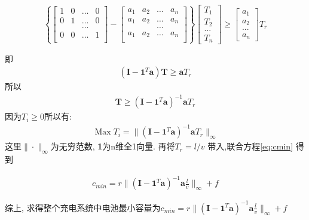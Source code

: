     \begin{equation}     
        \left\{
            \left[                 
                \begin{array}{cccc}   
                1 & 0 & \dots& 0 \\  
                0 & 1  & \dots& 0 \\ 
                &&\dots&\\
                0&0&\dots&1\\
                \end{array}
            \right] 
            -
            \left[                 
            \begin{array}{cccc}   
                a_1 & a_2 & \dots& a_n \\ 
                a_1 & a_2  & \dots& a_n \\  
                &&\dots&\\
                a_1&a_2&\dots&a_n\\
            \end{array}
            \right]    
        \right\}   
        \left[
            \begin{array}{cccc}
             T_1\\
             T_2\\
             ... \\
             T_{n}
            \end{array}
        \right ]
        \geq
        \left[
            \begin{array}{cccc}
            a_{1}\\
            a_{2}\\
            ... \\
            a_{n}
            \end{array}
        \right ]
        T_r 
        \end{equation}

即
\begin{eqnarray}
  (\textbf{I}- \textbf{1}^T\textbf{a} )\textbf{T} \geq \textbf{a} T_r
\end{eqnarray}
所以
\begin{eqnarray}
  \textbf{T} \geq   (\textbf{I}- \textbf{1}^T\textbf{a} )^{-1}\textbf{a} T_r
\end{eqnarray}
因为$T_i \geq 0$所以有:
\begin{eqnarray}
    \mathop{Max}T_i = \| (\textbf{I}- \textbf{1}^T\textbf{a} )^{-1}\textbf{a} T_r\|_{\infty}
\end{eqnarray}
这里$\|\cdot\|_\infty$为无穷范数, \textbf{1}为n维全1向量. 再将$ T_r = l/v$ 带入,联合方程\ref{eq:cmin} 得到

\begin{eqnarray}
    c_{min} =r \| (\textbf{I}- \textbf{1}^T\textbf{a} )^{-1}\textbf{a} \frac{l}{v}\|_{\infty} +f
\end{eqnarray}

综上, 求得整个充电系统中电池最小容量为$ c_{min} =r \| (\textbf{I}- \textbf{1}^T\textbf{a} )^{-1}\textbf{a} \frac{l}{v}\|_{\infty} +f $








